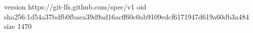 version https://git-lfs.github.com/spec/v1
oid sha256:1d54a37bdfb0fbaea39d9ad16acff60c0ab9109edcf6171947d619a60db3a484
size 1470
